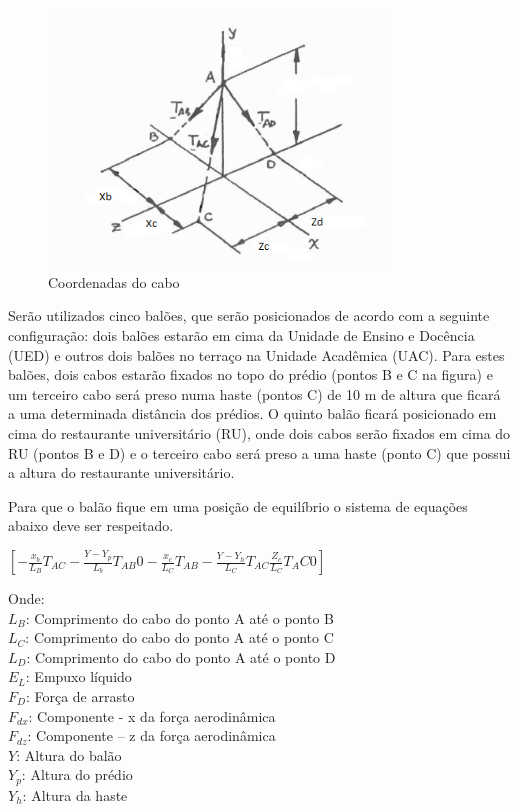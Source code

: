 	\begin{figure}[H]
		\centering
		\includegraphics[width=0.8\textwidth]{figuras/coorcabo}
		\caption[Coordenadas do cabo]{Coordenadas do cabo~\cite{beer}}
		\label{img:coordcabos}
	\end{figure}

	Serão utilizados cinco balões, que serão posicionados de acordo com a seguinte configuração: dois balões estarão em cima da Unidade de Ensino e Docência (UED) e outros dois balões no terraço na Unidade Acadêmica (UAC). Para estes balões, dois cabos estarão fixados no topo do prédio (pontos B e C na figura) e um terceiro cabo será preso numa haste (pontos C) de 10 m de altura que ficará a uma determinada distância dos prédios. O quinto balão ficará posicionado em cima do restaurante universitário (RU), onde dois cabos serão fixados em cima do RU (pontos B e D) e o terceiro cabo será preso a uma haste (ponto C) que possui a altura do restaurante universitário.

	Para que o balão fique em uma posição de equilíbrio o sistema de equações abaixo deve ser respeitado.

	$\left [ - \frac{x_{b}}{L_{B}}T_{AC} - \frac{Y-Y_{p}}{L_{b}}T_{AB}0 - \frac{x_{c}}{L_{C}}T_{AB} - \frac{Y-Y_{h}}{L_{C}}T_{AC} \frac{Z_{c}}{L_{C}}T_AC0 \right ]$

	Onde:\\
$L_{B}$: Comprimento do cabo do ponto A até o ponto B\\
$L_{C}$: Comprimento do cabo do ponto A até o ponto C\\
$L_{D}$: Comprimento do cabo do ponto A até o ponto D\\
$E_{L}$: Empuxo líquido\\
$F_{D}$: Força de arrasto\\
$F_{dx}$: Componente - x da força aerodinâmica\\
$F_{dz}$: Componente – z da força aerodinâmica\\
$Y$: Altura do balão\\
$Y_{p}$: Altura do prédio\\
$Y_{h}$: Altura da haste\\


